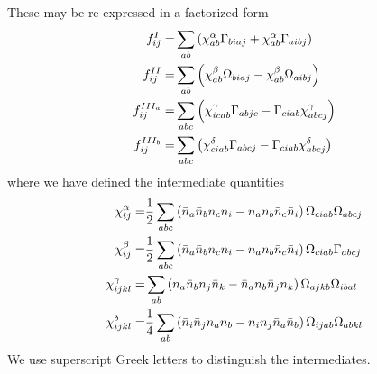 \documentclass[11pt]{article}
\newcommand{\MyRomanNum}[1]{%
\ifcase#1\or I\or II\or III\or IV\or V\or VI\or VII\or VIII\or IX\or X\else #1\fi}
\begin{document}
These may be re-expressed in a factorized form
\begin{subequations}\label{doubleCommutator_1b}
\begin{align} \allowdisplaybreaks[4] 
 f^\MyRomanNum{1}_{ij}  =& \sum_{ab} \left( \chi^{\alpha}_{ab}  \Gamma_{biaj} + \chi^{\alpha}_{ab} \Gamma_{aibj} \right) \\
f^{\MyRomanNum{2}}_{ij}   =& \sum_{ab} \left( \chi^{\beta}_{ab} \Omega_{biaj} - \chi^{\beta}_{ab} \Omega_{aibj} \right)\\
 f^{\MyRomanNum{3}_a}_{ij}  =& \sum_{abc} \left( \chi^{\gamma}_{icab} \Gamma_{abjc} -  \Gamma_{ciab}  \chi^{\gamma}_{abcj} \right)\\
f^{\MyRomanNum{3}_b}_{ij}  =& \sum_{abc} \left(\chi^{\delta}_{ciab}  \Gamma_{abcj} - \Gamma_{ciab} \chi^{\delta}_{abcj} \right)
\end{align}
\end{subequations}
where we have defined the intermediate quantities
\begin{subequations}\label{chi_1b}
\begin{align} \allowdisplaybreaks[4]
\chi^{\alpha}_{ij} =&\frac{1}{2} \sum_{abc} \left( \bar{n}_a \bar{n}_b  {n}_c  {n}_i  -  {n}_a {n}_b \bar{n}_c  \bar{n}_i \right)  \Omega_{ciab} \Omega_{abcj}  \\
\chi^{\beta}_{ij} =&\frac{1}{2} \sum_{abc} \left(  \bar{n}_a   \bar{n}_b {n}_c {n}_i  -  {n}_a  {n}_b   \bar{n}_c   \bar{n}_i \right) \Omega_{ciab} \Gamma_{abcj} \\
\chi^{\gamma}_{ijkl} =& \sum_{ab} \left(  {n}_a \bar{n}_b {n}_j  \bar{n}_k   -  \bar{n}_a {n}_b \bar{n}_j  {n}_k   \right)  \Omega_{ajkb} \Omega_{ibal} \\
% 
\chi^{\delta}_{ijkl} =& \frac{1}{4}\sum_{ab} \left( \bar{n}_i \bar{n}_j {n}_a {n}_b  -  {n}_i  {n}_j  \bar{n}_a \bar{n}_b  \right)  \Omega_{ijab} \Omega_{abkl}
\end{align}
\end{subequations}
We use superscript Greek letters to distinguish the intermediates.
\end{document}
